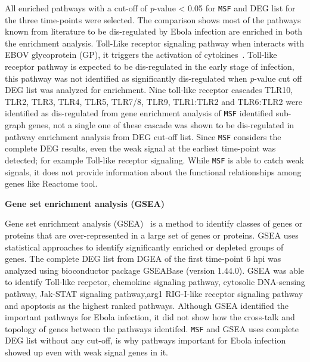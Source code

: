 \documentclass[10pt,a4paper,twocolumn]{article}
\newcommand{\FA}[1]{\begingroup\color{magenta}#1\endgroup}
\begin{document}
	All enriched pathways with a cut-off of \textit{p}-value
        < 0.05 for \texttt{MSF} and DEG list for the
        three time-points were selected. The comparison shows most of
        the pathways known from literature to be dis-regulated by
        Ebola infection are enriched in both the enrichment
        analysis. Toll-Like receptor signaling pathway when interacts
        with EBOV glycoprotein (GP), it triggers the activation of
        cytokines~\cite{Olejnik}. Toll-like receptor pathway is
        expected to be dis-regulated in the early stage of infection,
        this pathway was not identified as significantly dis-regulated
        when \textit{p}-value cut off DEG list was analyzed for
        enrichment. Nine toll-like receptor cascades TLR10, TLR2,
        TLR3, TLR4, TLR5, TLR7/8, TLR9, TLR1:TLR2 and TLR6:TLR2 were
        identified as dis-regulated from gene enrichment analysis of
        \texttt{MSF} identified sub-graph genes, not a single one of
        these cascade was shown to be dis-regulated in pathway
        enrichment analysis from DEG cut-off list. Since \texttt{MSF}
        considers the complete DEG results, even the weak signal at
        the earliest time-point was detected; for example Toll-like
        receptor signaling. While \texttt{MSF} is able to catch weak
        signals, it does not provide information about the functional
        relationships among genes like Reactome tool.
	
	\textbf{Gene set enrichment analysis (GSEA)}
	
	Gene set enrichment analysis (GSEA)~\cite{Subramanian15545}
        is a method to identify
        classes of genes or proteins that are over-represented in a
        large set of genes or proteins. GSEA uses statistical
        approaches to identify significantly enriched or depleted
        groups of genes. The complete DEG list from DGEA of the first
        time-point 6 hpi was analyzed using bioconductor package
        GSEABase (version 1.44.0). GSEA was able to identify
        Toll\FA{-}like recpetor, chemokine signaling pathway,
        cytosolic DNA-sensing pathway, Jak-STAT signaling pathway,arg1
        RIG-I-like receptor signaling pathway and apoptosis as the
        highest ranked pathways. Although GSEA identified the
        important pathways for Ebola infection, it did not show how
        the cross-talk and topology of genes between the pathways
        identifed. \texttt{MSF} and GSEA uses complete DEG list
        without any cut-off, is why pathways important for Ebola
        infection showed up even with weak signal genes in it.
	
\end{document}

